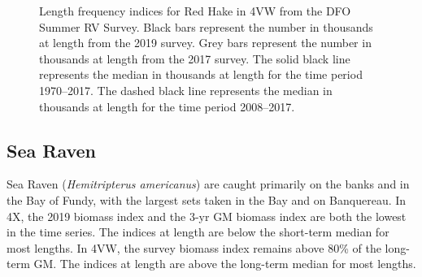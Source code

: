 \documentclass[11pt]{book}
\begin{document}
\begin{figure}[htb]

{\centering {} 

}

\caption{Length frequency indices for Red Hake in 4VW from the DFO Summer RV Survey. Black bars represent the number in thousands at length from the 2019 survey. Grey bars represent the number in thousands at length from the 2017 survey. The solid black line represents the median in thousands at length for the time period 1970--2017. The dashed black line represents the median in thousands at length for the time period 2008--2017.}\label{fig:112-fig-redhake-lengthfreq4VW}
\end{figure}
\clearpage

\hypertarget{sea-raven}{%
\subsection{Sea Raven}\label{sea-raven}}

Sea Raven (\emph{Hemitripterus americanus}) are caught primarily on the banks and in the Bay of Fundy, with the largest sets taken in the Bay and on Banquereau. In 4X, the 2019 biomass index and the 3-yr GM biomass index are both the lowest in the time series. The indices at length are below the short-term median for most lengths. In 4VW, the survey biomass index remains above 80\% of the long-term GM. The indices at length are above the long-term median for most lengths.
\end{document}
